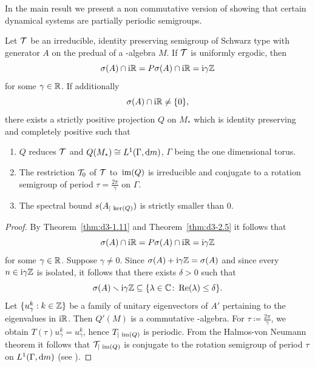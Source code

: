 In the main result we present a non commutative version of \textcite{nagel:1984} showing that certain dynamical systems are partially periodic semigroups.
\begin{proposition}\label{prop:d4-3.10}
Let $ \mathcal{T} $  be an irreducible, identity preserving semigroup of Schwarz type with generator $ A $  on the predual of a \WA-algebra $ M $.
If\/ $ \mathcal{T} $  is uniformly ergodic, then 
%
\[
	 \sigma(A) \cap \mathrm{i}\mathbb{R} = P\sigma(A) \cap \mathrm{i}\mathbb{R} = \mathrm{i}\gamma\mathbb{Z}  
\]
%
for some $ \gamma \in \mathbb{R} $.
If additionally 
%
\[
	\sigma(A) \cap \mathrm{i}\mathbb{R} \neq \{0\} ,
\]
%
there exists a strictly positive projection $ Q $  on $ M_{*} $  which is identity preserving and completely positive such that
\begin{enumerate}[\upshape (i)]
\item
$ Q $  reduces $ \mathcal{T} $  and $ Q(M_{*}) \cong L^{1}(\Gamma, \mathop{}\!\mathrm{d}{m}) $, $\Gamma$  being the one dimensional torus.

\item
The restriction $ \mathcal{T}_{0} $  of\/ $ \mathcal{T} $  to $ \mathop{}\mathrm{im}(Q) $  is irreducible and conjugate to a rotation semigroup of period $ \tau = \frac{2\pi}{\gamma} $  on $\Gamma$.

\item
The spectral bound $ s(A_{| \mathop{}\mathrm{ker}(Q) }) $  is strictly smaller than $ 0 $.
\end{enumerate}
\end{proposition}
\begin{proof}
By Theorem~\ref{thm:d3-1.11} and Theorem~\ref{thm:d3-2.5} it follows that
\[
\sigma(A) \cap \mathrm{i}\mathbb{R} = P\sigma(A) \cap \mathrm{i}\mathbb{R} = \mathrm{i}\gamma\mathbb{Z}
\]
for some $ \gamma \in \mathbb{R} $.
Suppose $ \gamma \neq 0 $.
Since $ \sigma(A) + \mathrm{i}\gamma\mathbb{Z} = \sigma(A) $  and since every $ n \in \mathrm{i}\gamma\mathbb{Z} $  is isolated, it follows that there exists $ \delta > 0 $  such that
\[
\sigma(A) \setminus \im\gamma\Z \subseteq \{\lambda \in \C \colon  \Re(\lambda) \leq \delta\}.
\]
Let $ \{u_{\gamma}^{k}: k \in \mathbb{Z}\} $  be a family of unitary eigenvectors of\/ $ A' $  pertaining to the eigenvalues in $ \mathrm{i}\mathbb{R} $.
Then $ Q'(M) $  is a commutative \WA-algebra.
For $ \tau \coloneqq \frac{2\pi}{\gamma} $, we obtain $ T(\tau)u_{\gamma}^{k} = u_{\gamma}^{k} $, hence $ T_{\vert \mathop{}\mathrm{im}(Q)} $  is periodic.
From the Halmos-von Neumann theorem it follows that $ \mathcal{T}_{\vert \mathop{}\mathrm{im}(Q)} $  is conjugate to the rotation semigroup of period $ \tau $  on $ L^{1}(\Gamma, \mathop{}\!\mathrm{d}{m}) $ (see \textcite[Theorem III.7.11]{schaefer:1974}).
\end{proof}
